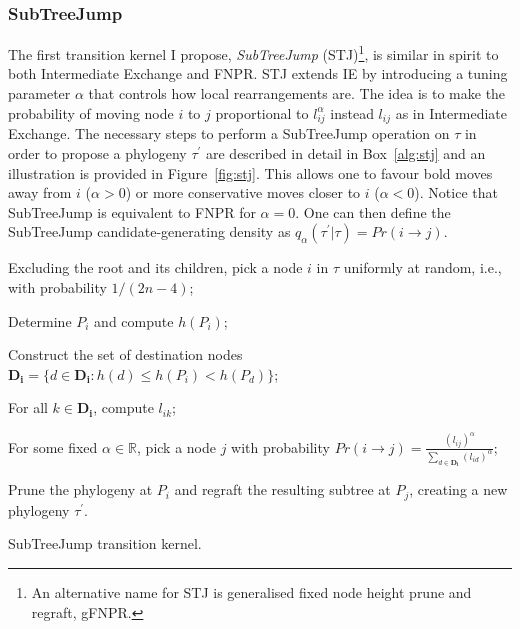 \subsubsection*{SubTreeJump} 

The first transition kernel I propose, \textit{SubTreeJump} (STJ)\footnote{An alternative name for STJ is generalised fixed node height prune and regraft, gFNPR.}, is similar in spirit to both Intermediate Exchange and FNPR.
STJ extends IE by introducing a tuning parameter $\alpha$ that controls how local rearrangements are.
The idea is to make the probability of moving node $i$ to $j$ proportional to $l_{ij}^\alpha$ instead $l_{ij}$ as in Intermediate Exchange.
The necessary steps to perform a SubTreeJump operation on $\tau$ in order to propose a phylogeny $\tau^\prime$ are described in detail in Box~\ref{alg:stj} and an illustration is provided in Figure~\ref{fig:stj}.
This allows one to favour bold moves away from $i$ ($\alpha > 0$) or more conservative moves closer to $i$ ($\alpha < 0$).
Notice that SubTreeJump is equivalent to FNPR for $\alpha = 0$.
One can then define the SubTreeJump candidate-generating density as $q_{\alpha}(\tau^\prime | \tau) = Pr(i\to j)$.

\begin{algorithm}[!ht]

\setcounter{AlgoLine}{-1}

 Excluding the root and its children, pick a node $i$ in  $\tau$ uniformly at random, i.e., with probability $1/(2n-4)$;
 
 Determine $P_i$ and compute $h(P_i)$;
 
 Construct the set of destination nodes $\mathbf{D_i} = \{ d \in \mathbf{D_i}  : h(d) \leq h(P_i) < h(P_d) \}$;
 
 For all $k \in \mathbf{D_i}$, compute $l_{ik}$;
 
 For some fixed $\alpha \in \mathbb{R}$, pick a node $j$ with probability $Pr(i\to j) = \frac{(l_{ij})^{\alpha}}{\sum_{d \in \mathbf{D_i}}(l_{id})^{\alpha}}$;
 
 Prune the phylogeny at $P_i$ and regraft the resulting subtree at $P_j$, creating a new phylogeny $\tau^\prime$. 
 
 \caption{SubTreeJump transition kernel.}
 \label{alg:stj}
\end{algorithm}

